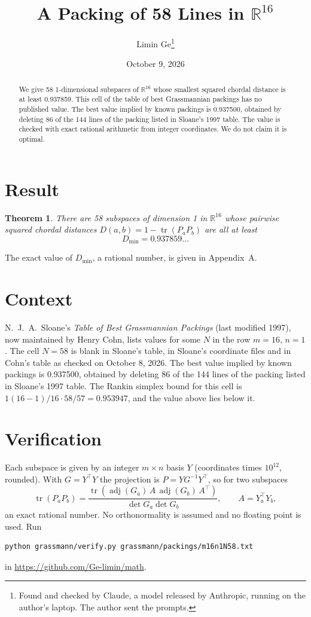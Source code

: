 \documentclass[11pt,a4paper]{article}
\title{A Packing of 58 Lines in $\mathbb{R}^{16}$}
\author{Limin Ge\thanks{Found and checked by Claude, a model released by Anthropic, running on the author's laptop. The author sent the prompts.}}
\date{October 9, 2026}
\newtheorem*{theorem}{Theorem}
\begin{document}
\maketitle
\begin{abstract}
We give 58 1-dimensional subspaces of $\mathbb{R}^{16}$ whose smallest squared chordal distance is at least 0.937859. This cell of the table of best Grassmannian packings has no published value. The best value implied by known packings is 0.937500, obtained by deleting 86 of the 144 lines of the packing listed in Sloane's 1997 table. The value is checked with exact rational arithmetic from integer coordinates. We do not claim it is optimal.
\end{abstract}

\section{Result}
\begin{theorem}
There are 58 subspaces of dimension 1 in $\mathbb{R}^{16}$ whose pairwise squared chordal distances $D(a,b) = 1 - \operatorname{tr}(P_aP_b)$ are all at least
\[ D_{\min} = 0.937859\ldots \]
\end{theorem}
The exact value of $D_{\min}$, a rational number, is given in Appendix~A.


\section{Context}
N.~J.~A.~Sloane's \emph{Table of Best Grassmannian Packings} (last modified 1997), now maintained by Henry Cohn, lists values for some $N$ in the row $m=16$, $n=1$. The cell $N=58$ is blank in Sloane's table, in Sloane's coordinate files and in Cohn's table as checked on October 8, 2026. The best value implied by known packings is 0.937500, obtained by deleting 86 of the 144 lines of the packing listed in Sloane's 1997 table. The Rankin simplex bound for this cell is $1(16-1)/16\cdot 58/57 = 0.953947$, and the value above lies below it.


\section{Verification}
Each subspace is given by an integer $m\times n$ basis $Y$ (coordinates times $10^{12}$, rounded). With $G=Y^\top Y$ the projection is $P=YG^{-1}Y^\top$, so for two subspaces
\[ \operatorname{tr}(P_aP_b)=\frac{\operatorname{tr}(\operatorname{adj}(G_a)\,A\,\operatorname{adj}(G_b)\,A^\top)}{\det G_a\det G_b},\qquad A=Y_a^\top Y_b, \]
an exact rational number. No orthonormality is assumed and no floating point is used. Run
\begin{verbatim}
python grassmann/verify.py grassmann/packings/m16n1N58.txt
\end{verbatim}
in \url{https://github.com/Ge-limin/math}.
\end{document}
